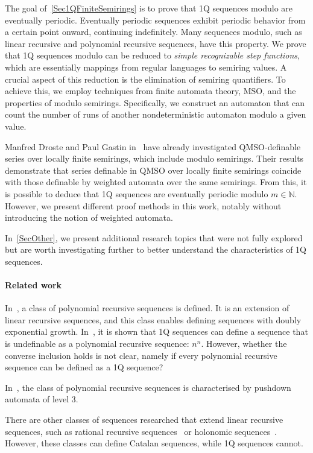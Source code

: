 \documentclass[en]{pracamgr}
\theoremstyle{definition}
\begin{document}
The goal of~\cref{Sec1QFiniteSemirings} is to prove that 1Q sequences modulo are eventually periodic. Eventually periodic sequences exhibit periodic behavior from a certain point onward, continuing indefinitely. Many sequences modulo, such as linear recursive and polynomial recursive sequences, have this property. We prove that 1Q sequences modulo can be reduced to \emph{simple recognizable step functions}, which are essentially mappings from regular languages to semiring values. A crucial aspect of this reduction is the elimination of semiring quantifiers. To achieve this, we employ techniques from finite automata theory, MSO, and the properties of modulo semirings. Specifically, we construct an automaton that can count the number of runs of another nondeterministic automaton modulo a given value.

Manfred Droste and Paul Gastin in~\cite{DrosteG07} have already investigated QMSO-definable series over locally finite semirings, which include modulo semirings. Their results demonstrate that series definable in QMSO over locally finite semirings coincide with those definable by weighted automata over the same semirings. From this, it is possible to deduce that 1Q sequences are eventually periodic modulo $m \in \mathbb{N}$. However, we present different proof methods in this work, notably without introducing the notion of weighted automata.

In~\cref{SecOther}, we present additional research topics that were not fully explored but are worth investigating further to better understand the characteristics of 1Q sequences.

\paragraph*{Related work}
In~\cite{CadilhacMPPS20}, a class of polynomial recursive sequences is defined. It is an extension of linear recursive sequences, and this class enables defining sequences with doubly exponential growth. In~\cite{CadilhacMPPS20}, it is shown that 1Q sequences can define a sequence that is undefinable as a polynomial recursive sequence: $n^n$. However, whether the converse inclusion holds is not clear, namely if every polynomial recursive sequence can be defined as a 1Q sequence?

In~\cite{Zerg}, the class of polynomial recursive sequences is characterised by pushdown automata of level 3.

There are other classes of sequences researched that extend linear recursive sequences, such as rational recursive sequences~\cite{ClementeDMP23} or holonomic sequences~\cite{KenisonKLLMOW021}. However, these classes can define Catalan sequences, while 1Q sequences cannot.
\end{document}
